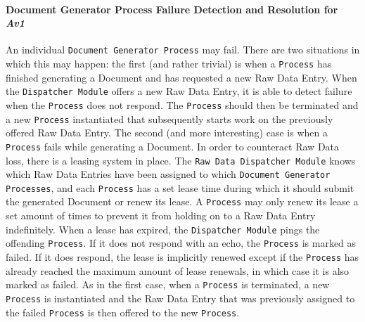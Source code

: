 \documentclass[a4paper,10pt]{article}
\begin{document}
\paragraph{Document Generator Process Failure Detection and Resolution for \emph{Av1}}
An individual \texttt{Document Generator Process} may fail. There are two situations in which this may happen: the first (and rather trivial) is when a \texttt{Process} has finished generating a Document and has requested a new Raw Data Entry. When the \texttt{Dispatcher Module} offers a new Raw Data Entry, it is able to detect failure when the \texttt{Process} does not respond. The \texttt{Process} should then be terminated and a new \texttt{Process} instantiated that subsequently starts work on the previously offered Raw Data Entry. The second (and more interesting) case is when a \texttt{Process} fails while generating a Document. In order to counteract Raw Data loss, there is a leasing system in place. The \texttt{Raw Data Dispatcher Module} knows which Raw Data Entries have been assigned to which \texttt{Document Generator Processes}, and each \texttt{Process} has a set lease time during which it should submit the generated Document or renew its lease. A \texttt{Process} may only renew its lease a set amount of times to prevent it from holding on to a Raw Data Entry indefinitely. When a lease has expired, the \texttt{Dispatcher Module} pings the offending \texttt{Process}. If it does not respond with an echo, the \texttt{Process} is marked as failed. If it does respond, the lease is implicitly renewed except if the \texttt{Process} has already reached the maximum amount of lease renewals, in which case it is also marked as failed. As in the first case, when a \texttt{Process} is terminated, a new \texttt{Process} is instantiated and the Raw Data Entry that was previously assigned to the failed \texttt{Process} is then offered to the new \texttt{Process}. 
\end{document}
